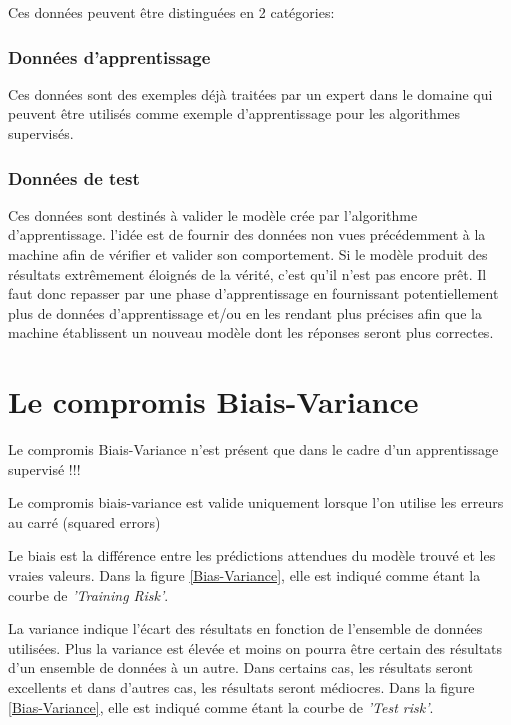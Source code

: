 \documentclass[a4paper]{article}
\begin{document}
Ces données peuvent être distinguées en 2 catégories:

\subsubsection{Données d'apprentissage}
Ces données sont des exemples déjà traitées par un expert dans le domaine qui peuvent être utilisés comme exemple d'apprentissage pour les algorithmes supervisés.

\subsubsection{Données de test}
Ces données sont destinés à valider le modèle crée par l'algorithme d'apprentissage. l'idée est de fournir des données non vues précédemment à la machine afin de vérifier et valider son comportement. Si le modèle produit des résultats extrêmement éloignés de la vérité, c'est qu'il n'est pas encore prêt. Il faut donc repasser par une phase d'apprentissage en fournissant potentiellement plus de données d'apprentissage et/ou en les rendant plus précises afin que la machine établissent un nouveau modèle dont les réponses seront plus correctes.

\newpage

\section{Le compromis Biais-Variance}
\label{B-V}
Le compromis Biais-Variance n'est présent que dans le cadre d'un apprentissage supervisé !!!

Le compromis biais-variance est valide uniquement lorsque l'on utilise les erreurs au carré (squared errors)

Le biais est la différence entre les prédictions attendues du modèle trouvé et les vraies valeurs. Dans la figure \ref{Bias-Variance}, elle est indiqué comme étant la courbe de \textit{'Training Risk'}.   \newline

La variance indique l'écart des résultats en fonction de l'ensemble de données utilisées. Plus la variance est élevée et moins on pourra être certain des résultats d'un ensemble de données à un autre. Dans certains cas, les résultats seront excellents et dans d'autres cas, les résultats seront médiocres. Dans la figure \ref{Bias-Variance}, elle est indiqué comme étant la courbe de \textit{'Test risk'}. \newline
\end{document}
